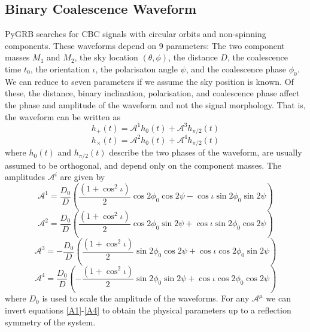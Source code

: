 \documentclass[11pt]{cuthesis}
\begin{document}
\subsection{Binary Coalescence Waveform} 
PyGRB searches for CBC signals with circular orbits and non-spinning components. These waveforms depend on 9 parameters: The two component masses $M_1$ and $M_2$, the sky location $(\theta, \phi)$, the distance $D$, the coalescence time $t_0$, the orientation $\iota$, the polarisaton angle $\psi$, and the coalescence phase $\phi_0$. We can reduce to seven parameters if we assume the sky position is known. Of these, the distance, binary inclination, polarisation, and coalescence phase affect the phase and amplitude of the waveform and not the signal morphology. That is, the waveform can be written as
\begin{equation} \label{hp}
h_+(t) = \mathcal{A}^1 h_0(t) + \mathcal{A}^3 h_{\pi/2}(t)
\end{equation}
\begin{equation} \label{hx}
h_\times(t) = \mathcal{A}^2 h_0(t) + \mathcal{A}^4 h_{\pi/2}(t)
\end{equation}
where $h_0(t)$ and $h_{\pi/2}(t)$ describe the two phases of the waveform, are usually assumed to be orthogonal, and depend only on the component masses. The amplitudes $\mathcal{A}^i$ are given by 
\begin{equation} \label{A1}
\mathcal{A}^1 = \frac{D_0}{D} \left( \frac{(1+\cos^2 \iota)}{2} \cos 2\phi_0 \cos 2\psi -  \cos \iota \sin 2 \phi_0 \sin 2\psi \right)
\end{equation}
\begin{equation}
\mathcal{A}^2 = \frac{D_0}{D} \left( \frac{(1+\cos^2 \iota)}{2} \cos 2\phi_0 \sin 2\psi +  \cos \iota \sin 2 \phi_0 \cos 2\psi \right)
\end{equation}
\begin{equation}
\mathcal{A}^3 = -\frac{D_0}{D} \left( \frac{(1+\cos^2 \iota)}{2} \sin 2\phi_0 \cos 2\psi +  \cos \iota \cos 2 \phi_0 \sin 2\psi \right)
\end{equation}
\begin{equation} \label{A4}
\mathcal{A}^4 = \frac{D_0}{D} \left( -\frac{(1+\cos^2 \iota)}{2} \sin 2\phi_0 \sin 2\psi +  \cos \iota \cos 2 \phi_0 \cos 2\psi \right)
\end{equation}
where $D_0$ is used to scale the amplitude of the waveforms. For any $\mathcal{A}^\mu$ we can invert equations \ref{A1}-\ref{A4} to obtain the physical parameters up to a reflection symmetry of the system. 
\end{document}
